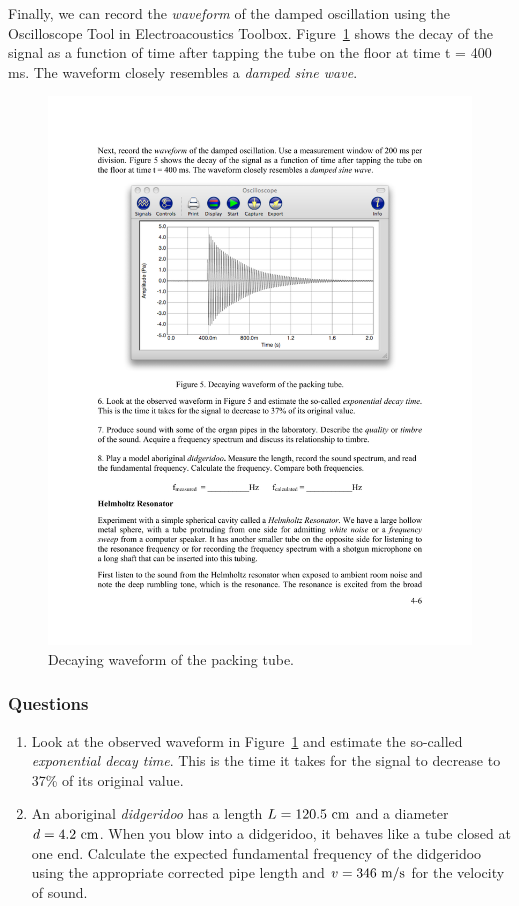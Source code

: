 \documentclass[11pt]{NSF}
\def\ben{\begin{enumerate}}
\def\een{\end{enumerate}}
\def\i{\item{}}
\begin{document}
Finally, we can record the {\em waveform} of the damped oscillation using 
the Oscilloscope Tool in Electroacoustics Toolbox.
Figure~\ref{f:5} shows the decay of the signal as a function of
time after tapping the tube on the floor at time t = 400 ms. The waveform
closely resembles a {\em damped sine wave}.
%
\begin{figure}[hbtp]
\begin{center}
\includegraphics[width=.7\textwidth]{fig4_5}
\caption{Decaying waveform of the packing tube.}
\label{f:5} 
\end{center} 
\end{figure}
%

\subsubsection*{Questions}
\ben
\i Look at the observed waveform in Figure~\ref{f:5} and 
estimate the so-called {\em exponential decay time}. 
This is the time it takes for the signal to decrease to
37\% of its original value.

\i An aboriginal {\em didgeridoo} has a length $L=120.5~{\rm cm}$
and a diameter $d=4.2~{\rm cm}$.
When you blow into a didgeridoo, it behaves like a tube closed at one end.
Calculate the expected fundamental frequency of the didgeridoo
using the appropriate corrected pipe length and $v=346~{\rm m/s}$
for the velocity of sound.

\een
\end{document}
